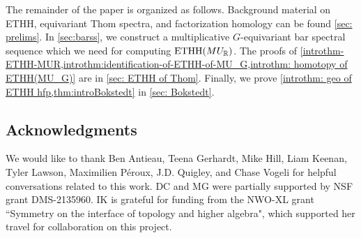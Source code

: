 The remainder of the paper is organized as follows. Background material on ETHH, equivariant Thom spectra, and factorization homology can be found \cref{sec: prelims}.  In \cref{sec:barss}, we construct a multiplicative $G$-equivariant bar spectral sequence which we need for computing $\mathrm{ETHH}(MU_{\mathbb{R}})$.  The proofs of \cref{introthm-ETHH-MUR,introthm:identification-of-ETHH-of-MU_G,introthm: homotopy of ETHH(MU_G)} are in \cref{sec: ETHH of Thom}.  Finally, we prove \cref{introthm: geo of ETHH hfp,thm:introBokstedt} in \cref{sec: Bokstedt}.


\subsection{Acknowledgments}
We would like to thank Ben Antieau, Teena Gerhardt, Mike Hill, Liam Keenan, Tyler Lawson, Maximilien P\'eroux, J.D. Quigley, and Chase Vogeli for helpful conversations related to this work.  DC and MG were partially supported by NSF grant DMS-2135960. IK is grateful for funding from the NWO-XL grant ``Symmetry on the interface of topology and higher algebra", which supported her travel for collaboration on this project. %